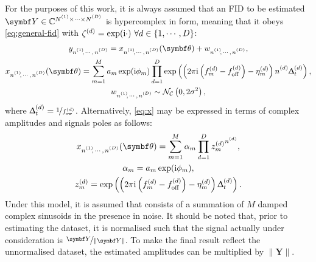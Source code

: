 For the purposes of this work, it is always assumed that an \ac{FID} to be
estimated
$\bY \in \mathbb{C}^{\None \times \cdots \times \ND}$
is hypercomplex in form, meaning that it obeys
\cref{eq:general-fid} with $\zeta^{(d)} = \exp(\mathrm{i} \cdot)\ \forall d \in
\lbrace 1, \cdots, D \rbrace$:
\begin{subequations}
    \begin{gather}
        \ynonenD = \xnonenD(\bth) + \wnonenD,\\
        \xnonenD(\bth) =
        \sumM \amexpphim
        \prodD \exp\left(\left(
            2 \pi \iu \left(f^{(d)}_m - \foffd\right)
            -\eta_m^{(d)}\right)
            \nd \Dtd\right),\label{eq:x}\\
        \wnonenD \sim \mathcal{N_C}\left(0, 2\sigma^2\right),%
        \label{eq:complex-normal}
    \end{gather}%
    \label{eq:hypercomplex-fid}%
\end{subequations}%
where $\Updelta_t^{(d)} = \nicefrac{1}{f_{\mathrm{sw}}^{(d)}}$.
Alternatively, \cref{eq:x} may be expressed in terms of complex amplitudes and
signals poles as follows:
\begin{subequations}%
    \begin{gather}%
        \xnonenD(\bth) = \sumM \alpha_m \prodD {z^{(d)}_m}^{\nd},\\
        \alpha_m = \amexpphim,\\
        z_m^{(d)} = \exp\left(
            \left(2 \pi \iu \left(f_m^{(d)} - \foffd\right) - \eta^{(d)}_m\right) \Dtd
        \right).%
    \end{gather}%
    \label{eq:x-alpha-z}%
\end{subequations}%
Under this model, it is assumed that
 consists of a summation of $M$ damped complex sinusoids in the
presence in noise.
It should be noted that, prior to estimating the dataset, it is normalised
such that the signal actually under consideration is $\nicefrac{\bY}{\lVert \bY
\rVert}$.
To make the final result reflect the unnormalised dataset, the estimated
amplitudes can be multiplied by $\lVert \symbf{Y} \rVert$.

